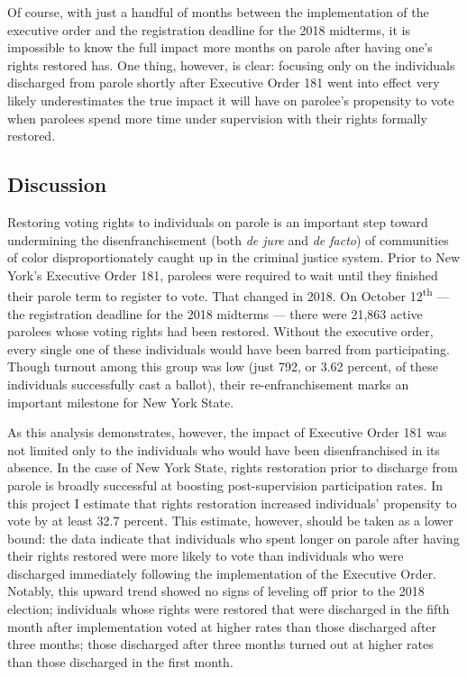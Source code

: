 \documentclass[12pt,]{article}
\begin{document}
Of course, with just a handful of months between the implementation of the executive order and the registration deadline for the 2018 midterms, it is impossible to know the full impact more months on parole after having one's rights restored has. One thing, however, is clear: focusing only on the individuals discharged from parole shortly after Executive Order 181 went into effect very likely underestimates the true impact it will have on parolee's propensity to vote when parolees spend more time under supervision with their rights formally restored.

\hypertarget{discussion-1}{%
\subsection*{Discussion}\label{discussion-1}}

Restoring voting rights to individuals on parole is an important step toward undermining the disenfranchisement (both \emph{de jure} and \emph{de facto}) of communities of color disproportionately caught up in the criminal justice system. Prior to New York's Executive Order 181, parolees were required to wait until they finished their parole term to register to vote. That changed in 2018. On October 12\textsuperscript{th} --- the registration deadline for the 2018 midterms --- there were 21,863 active parolees whose voting rights had been restored. Without the executive order, every single one of these individuals would have been barred from participating. Though turnout among this group was low (just 792, or 3.62 percent, of these individuals successfully cast a ballot), their re-enfranchisement marks an important milestone for New York State.

As this analysis demonstrates, however, the impact of Executive Order 181 was not limited only to the individuals who would have been disenfranchised in its absence. In the case of New York State, rights restoration prior to discharge from parole is broadly successful at boosting post-supervision participation rates. In this project I estimate that rights restoration increased individuals' propensity to vote by at least 32.7 percent. This estimate, however, should be taken as a lower bound: the data indicate that individuals who spent longer on parole after having their rights restored were more likely to vote than individuals who were discharged immediately following the implementation of the Executive Order. Notably, this upward trend showed no signs of leveling off prior to the 2018 election; individuals whose rights were restored that were discharged in the fifth month after implementation voted at higher rates than those discharged after three months; those discharged after three months turned out at higher rates than those discharged in the first month.
\end{document}
